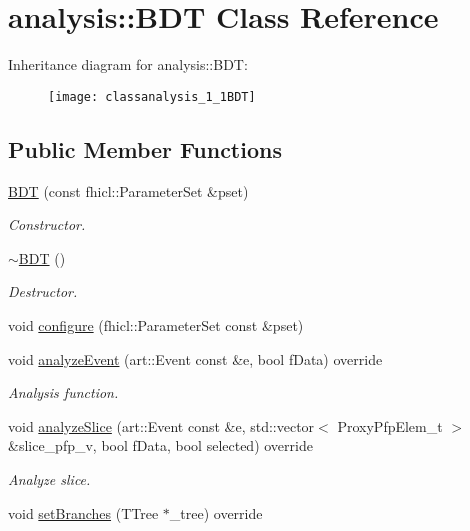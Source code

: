 \hypertarget{classanalysis_1_1BDT}{}\section{analysis\+:\+:B\+DT Class Reference}
\label{classanalysis_1_1BDT}
Inheritance diagram for analysis\+:\+:B\+DT\+:\begin{figure}[H]
\begin{center}
\leavevmode
\texttt{[image: classanalysis\_1\_1BDT]}
\end{center}
\end{figure}
\subsection*{Public Member Functions}
\begin{DoxyCompactItemize}
\item 
\hyperlink{classanalysis_1_1BDT_aa9f94ba60d96e98fd4b751988a08124c}{B\+DT} (const fhicl\+::\+Parameter\+Set \&pset)
\begin{DoxyCompactList}\small\item\em Constructor. \end{DoxyCompactList}\item 
\hyperlink{classanalysis_1_1BDT_ab6b0e7aa2281260856394e13903d6f21}{$\sim$\+B\+DT} ()\hypertarget{classanalysis_1_1BDT_ab6b0e7aa2281260856394e13903d6f21}{}\label{classanalysis_1_1BDT_ab6b0e7aa2281260856394e13903d6f21}

\begin{DoxyCompactList}\small\item\em Destructor. \end{DoxyCompactList}\item 
void \hyperlink{classanalysis_1_1BDT_a6605350a483110b5a866256f4edcec3c}{configure} (fhicl\+::\+Parameter\+Set const \&pset)
\item 
void \hyperlink{classanalysis_1_1BDT_abadae5b35cecaca0409c0ba659aa7b82}{analyze\+Event} (art\+::\+Event const \&e, bool f\+Data) override\hypertarget{classanalysis_1_1BDT_abadae5b35cecaca0409c0ba659aa7b82}{}\label{classanalysis_1_1BDT_abadae5b35cecaca0409c0ba659aa7b82}

\begin{DoxyCompactList}\small\item\em Analysis function. \end{DoxyCompactList}\item 
void \hyperlink{classanalysis_1_1BDT_ab31b4dac24b518a017d4a1898c76991d}{analyze\+Slice} (art\+::\+Event const \&e, std\+::vector$<$ Proxy\+Pfp\+Elem\+\_\+t $>$ \&slice\+\_\+pfp\+\_\+v, bool f\+Data, bool selected) override
\begin{DoxyCompactList}\small\item\em Analyze slice. \end{DoxyCompactList}\item 
void \hyperlink{classanalysis_1_1BDT_a2a849ddc24460a2e014b425c8ff17131}{set\+Branches} (T\+Tree $\ast$\+\_\+tree) override\hypertarget{classanalysis_1_1BDT_a2a849ddc24460a2e014b425c8ff17131}{}\label{classanalysis_1_1BDT_a2a849ddc24460a2e014b425c8ff17131}


\end{DoxyCompactItemize}
